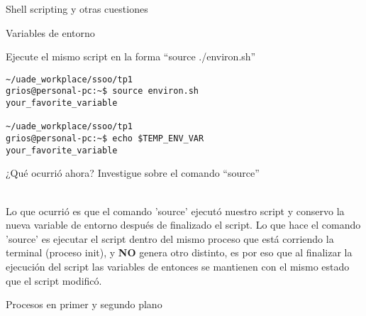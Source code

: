 \begin{section}{Shell scripting y otras cuestiones}
\begin{subsection}{Variables de entorno}
\begin{quoting}
Ejecute el mismo script en la forma “source ./environ.sh”
\end{quoting}
\begin{lstlisting}[style=Ubuntu]
~/uade_workplace/ssoo/tp1
grios@personal-pc:~$ source environ.sh 
your_favorite_variable 

~/uade_workplace/ssoo/tp1
grios@personal-pc:~$ echo $TEMP_ENV_VAR
your_favorite_variable
\end{lstlisting}

\begin{quoting}
¿Qué ocurrió ahora? Investigue sobre el comando “source”
\end{quoting}\\
Lo que ocurrió es que el comando 'source' ejecutó nuestro script y conservo la nueva variable de entorno después de finalizado el script. 
Lo que hace el comando 'source' es ejecutar el script dentro del mismo proceso que está corriendo la terminal (proceso init), y \textbf{NO} genera otro distinto, es por eso que al finalizar la ejecución del script las variables de entonces se mantienen con el mismo estado que el script modificó.

\end{subsection}

\begin{subsection}{Procesos en primer y segundo plano}
\end{subsection}


\end{section}